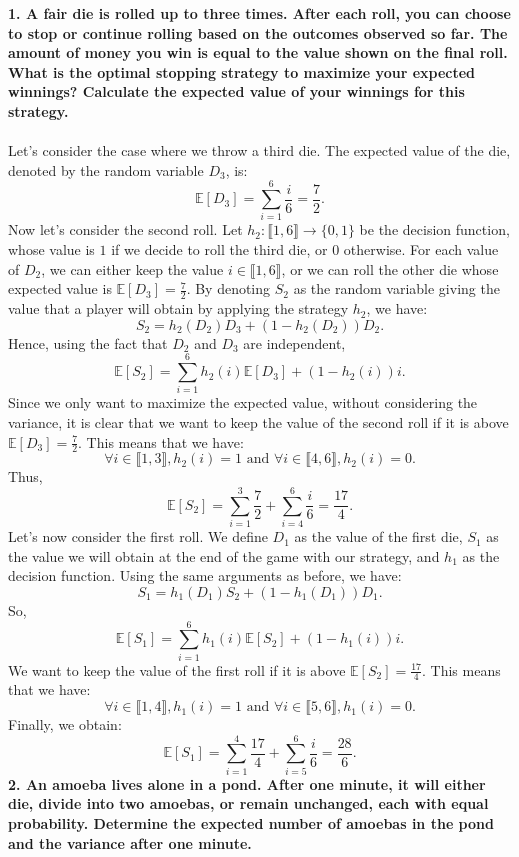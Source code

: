 \documentclass[a4paper,11pt]{article}
\begin{document}
\textbf{1. A fair die is rolled up to three times. After each roll, you can choose to stop or continue rolling based on the outcomes observed so far. The amount of money you win is equal to the value shown on the final roll. What is the optimal stopping strategy to maximize your expected winnings? Calculate the expected value of your winnings for this strategy.}
\\ \\
Let's consider the case where we throw a third die. The expected value of the die, denoted by the random variable \(D_3\), is:
\[
\mathbb{E}[D_3] = \sum_{i=1}^6 \frac{i}{6} = \frac{7}{2}.
\] 
Now let's consider the second roll. Let \(h_2 : \llbracket 1, 6 \rrbracket \to \{0, 1\}\) be the decision function, whose value is \(1\) if we decide to roll the third die, or \(0\) otherwise. For each value of \(D_2\), we can either keep the value \(i \in \llbracket 1, 6 \rrbracket\), or we can roll the other die whose expected value is \(\displaystyle \mathbb{E}[D_3] = \frac{7}{2}\). By denoting \(S_2\) as the random variable giving the value that a player will obtain by applying the strategy \(h_2\), we have:
\[
S_2 = h_2(D_2)D_3 + (1 - h_2(D_2))D_2.
\]
Hence, using the fact that \(D_2\) and \(D_3\) are independent,
\[
\mathbb{E}[S_2] = \sum_{i=1}^{6} h_2(i)\mathbb{E}[D_3] +  (1 - h_2(i))i.
\]
Since we only want to maximize the expected value, without considering the variance, it is clear that we want to keep the value of the second roll if it is above \(\mathbb{E}[D_3] = \displaystyle \frac{7}{2}\). This means that we have:
\[
\forall i \in \llbracket 1, 3 \rrbracket, h_2(i) = 1 \text{ and } \forall i \in \llbracket 4, 6 \rrbracket, h_2(i) = 0.
\]
Thus,
\[
\mathbb{E}[S_2] = \sum_{i=1}^{3} \frac{7}{2} + \sum_{i=4}^{6} \frac{i}{6} = \frac{17}{4}.
\]
Let's now consider the first roll. We define \(D_1\) as the value of the first die, \(S_1\) as the value we will obtain at the end of the game with our strategy, and \(h_1\) as the decision function. Using the same arguments as before, we have:
\[
S_1 = h_1(D_1)S_2 + (1 - h_1(D_1))D_1.
\]
So,
\[
\mathbb{E}[S_1] = \sum_{i=1}^{6} h_1(i)\mathbb{E}[S_2] +  (1 - h_1(i))i.
\]
We want to keep the value of the first roll if it is above \(\mathbb{E}[S_2] = \displaystyle \frac{17}{4}\). This means that we have:
\[
\forall i \in \llbracket 1, 4 \rrbracket, h_1(i) = 1 \text{ and } \forall i \in \llbracket 5, 6 \rrbracket, h_1(i) = 0.
\]
Finally, we obtain:
\[
\boxed{
\mathbb{E}[S_1] = \sum_{i=1}^{4} \frac{17}{4} + \sum_{i=5}^{6} \frac{i}{6} = \frac{28}{6}.
}
\]
\textbf{2. An amoeba lives alone in a pond. After one minute, it will either die, divide into two amoebas, or remain unchanged, each with equal probability. Determine the expected number of amoebas in the pond and the variance after one minute.}
\end{document}
